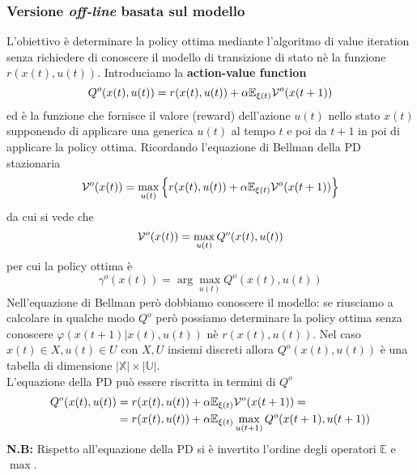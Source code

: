 \subsubsection{Versione \textit{off-line} basata sul modello}
L'obiettivo \`e determinare la policy ottima mediante l'algoritmo di value iteration senza richiedere di conoscere il modello di transizione di stato n\`e la funzione $r(x(t),u(t))$. Introduciamo la \textbf{action-value function}
\begin{equation}
Q^o (x(t), u(t)) = r(x(t),u(t)) + \alpha \mathbb{E}_{\xi(t)} \mathcal{V}^o(x(t+1))
\end{equation} ed \`e la funzione che fornisce il valore (reward) dell'azione $u(t)$ nello stato $x(t)$ supponendo di applicare una generica $u(t)$ al tempo $t$ e poi da $t+1$ in poi di applicare la policy ottima. Ricordando l'equazione di Bellman della PD stazionaria
\begin{equation}
\mathcal{V}^o(x(t)) = \max_{u(t)} \Big \{ r(x(t), u(t)) + \alpha \mathbb{E}_{\xi(t)} \mathcal{V}^o (x(t+1)) \Big \}
\end{equation} da cui si vede che
\begin{equation}
\mathcal{V}^o(x(t)) = \max_{u(t)} Q^o (x(t), u(t))
\end{equation} per cui la policy ottima \`e
\begin{equation}
\gamma^o(x(t)) = \arg \max_{u(t)} Q^o (x(t), u(t))
\end{equation} Nell'equazione di Bellman per\`o dobbiamo conoscere il modello: se riusciamo a calcolare in qualche modo $Q^o$ per\`o possiamo determinare la policy ottima senza conoscere $\varphi (x(t+1)|x(t),u(t))$ n\`e $r(x(t),u(t))$. Nel caso $x(t) \in X, u(t) \in U$ con $X,U$ insiemi discreti allora $Q^o(x(t), u(t))$ \`e una tabella di dimensione $|\mathbb{X}| \times |\mathbb{U}|$.\\
L'equazione della PD pu\`o essere riscritta in termini di $Q^o$
\begin{align}
Q^o (x(t), u(t)) &= r(x(t),u(t)) + \alpha \mathbb{E}_{\xi(t)} \mathcal{V}^o(x(t+1)) = \\
&= r(x(t),u(t)) + \alpha \mathbb{E}_{\xi(t)} \max_{u(t+1)} Q^o(x(t+1), u(t+1))
\end{align}
\textbf{N.B:} Rispetto all'equazione della PD si \`e invertito l'ordine degli operatori $\mathbb{E}$ e $\max$.

